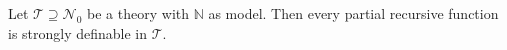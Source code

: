 Let $\mathcal{T} \supseteq \mathcal{N}_0$ be a theory with $\mathbb{N}$ as model. Then every partial recursive function is strongly definable in $\mathcal{T}$.
